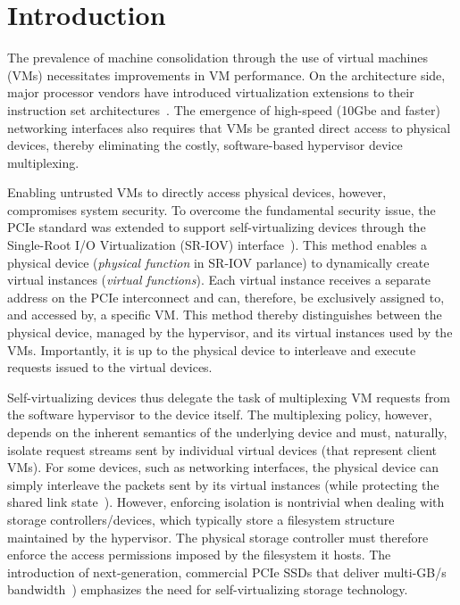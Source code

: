 \section{Introduction}
\label{sec:intro}


The prevalence of machine consolidation through the use of virtual machines (VMs) necessitates improvements in VM performance. On the architecture side, major processor vendors have introduced virtualization extensions to their instruction set architectures~\cite{popek1974formal,intel,armv8}.
The emergence of high-speed (10Gbe and faster) networking interfaces also requires that VMs be granted direct access to  physical devices, thereby eliminating the costly, software-based hypervisor device multiplexing.

Enabling untrusted VMs to directly access physical devices, however, compromises system security.
To overcome the fundamental security issue, the PCIe standard was extended to support self-virtualizing devices through the Single-Root I/O Virtualization (SR-IOV) interface~\cite{pcisigiov}).
This method enables a physical device (\emph{physical function} in SR-IOV parlance) to dynamically create virtual instances (\emph{virtual functions}). Each virtual instance receives a separate address on the PCIe interconnect and can, therefore, be exclusively assigned to, and accessed by, a specific VM. This method thereby distinguishes between the physical device, managed by the hypervisor, and its virtual instances used by the VMs.
%
Importantly, it is up to the physical device to interleave and execute requests issued to the virtual devices.

Self-virtualizing devices thus delegate the task of multiplexing VM requests from the software hypervisor to the device itself.
The multiplexing policy, however, depends on the inherent semantics of the underlying device and must, naturally, isolate request streams sent by individual virtual devices (that represent client VMs).
For some devices, such as networking interfaces, the physical device can simply interleave the packets sent by its virtual instances (while protecting the shared link state~\cite{smolyar15sriovsec}).
%
However, enforcing isolation is nontrivial when dealing with storage controllers/devices, which typically store a filesystem structure maintained by the hypervisor. The physical storage controller must therefore enforce the access permissions imposed by the filesystem it hosts.
%
The introduction of next-generation, commercial PCIe SSDs that deliver multi-GB/s bandwidth~\cite{intel-ssd,seagate16ssd}) emphasizes the need for self-virtualizing storage technology.

